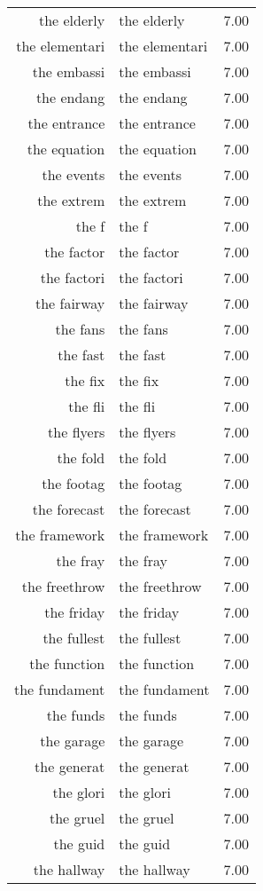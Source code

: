 \begin{table}[ht]
\begin{tabular}{rlr}
  the elderly & the elderly & 7.00 \\ 
  the elementari & the elementari & 7.00 \\ 
  the embassi & the embassi & 7.00 \\ 
  the endang & the endang & 7.00 \\ 
  the entrance & the entrance & 7.00 \\ 
  the equation & the equation & 7.00 \\ 
  the events & the events & 7.00 \\ 
  the extrem & the extrem & 7.00 \\ 
  the f & the f & 7.00 \\ 
  the factor & the factor & 7.00 \\ 
  the factori & the factori & 7.00 \\ 
  the fairway & the fairway & 7.00 \\ 
  the fans & the fans & 7.00 \\ 
  the fast & the fast & 7.00 \\ 
  the fix & the fix & 7.00 \\ 
  the fli & the fli & 7.00 \\ 
  the flyers & the flyers & 7.00 \\ 
  the fold & the fold & 7.00 \\ 
  the footag & the footag & 7.00 \\ 
  the forecast & the forecast & 7.00 \\ 
  the framework & the framework & 7.00 \\ 
  the fray & the fray & 7.00 \\ 
  the freethrow & the freethrow & 7.00 \\ 
  the friday & the friday & 7.00 \\ 
  the fullest & the fullest & 7.00 \\ 
  the function & the function & 7.00 \\ 
  the fundament & the fundament & 7.00 \\ 
  the funds & the funds & 7.00 \\ 
  the garage & the garage & 7.00 \\ 
  the generat & the generat & 7.00 \\ 
  the glori & the glori & 7.00 \\ 
  the gruel & the gruel & 7.00 \\ 
  the guid & the guid & 7.00 \\ 
  the hallway & the hallway & 7.00 \\ 

\end{tabular}
\end{table}
